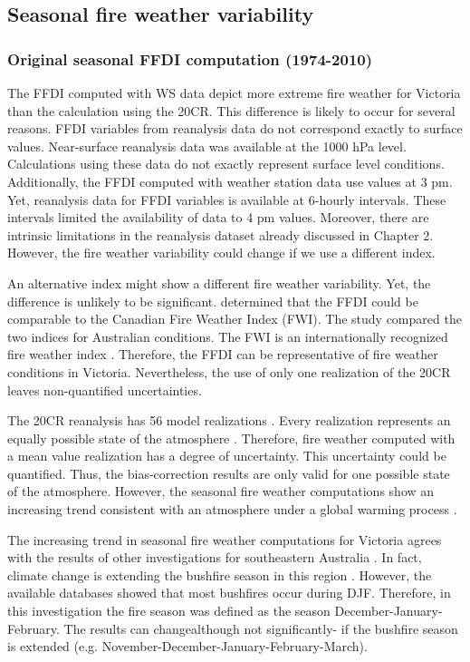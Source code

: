 \subsection{Seasonal fire weather variability \label{sub:Seasonal-fire-weather-variability}}


\subsubsection{Original seasonal FFDI computation (1974-2010)}

The FFDI computed with WS data depict more extreme fire weather for
Victoria than the calculation using the 20CR. This difference is likely
to occur for several reasons. FFDI variables from reanalysis data
do not correspond exactly to surface values. Near-surface reanalysis
data was available at the 1000 hPa level. Calculations using these
data do not exactly represent surface level conditions. Additionally,
the FFDI computed with weather station data use values at 3 pm. Yet,
reanalysis data for FFDI variables is available at 6-hourly intervals.
These intervals limited the availability of data to 4 pm values. Moreover,
there are intrinsic limitations in the reanalysis dataset already
discussed in Chapter 2. However, the fire weather variability could
change if we use a different index. 

An alternative index might show a different fire weather variability.
Yet, the difference is unlikely to be significant. \citet{Dowdy2009}
determined that the FFDI could be comparable to the Canadian Fire
Weather Index (FWI). The study compared the two indices for Australian
conditions. The FWI is an internationally recognized fire weather
index \citep{VanWagner1974,VanWagner2005,Dowdy2009a}. Therefore,
the FFDI can be representative of fire weather conditions in Victoria.
Nevertheless, the use of only one realization of the 20CR leaves non-quantified
uncertainties. 

The 20CR reanalysis has 56 model realizations \citep{Compo2011}.
Every realization represents an equally possible state of the atmosphere
\citep{Compo2011}. Therefore, fire weather computed with a mean value
realization has a degree of uncertainty. This uncertainty could be
quantified. Thus, the bias-correction results are only valid for one
possible state of the atmosphere. However, the seasonal fire weather
computations show an increasing trend consistent with an atmosphere
under a global warming process \citep{Stocker2013}. 

The increasing trend in seasonal fire weather computations for Victoria
agrees with the results of other investigations for southeastern Australia
\citep{Lucas2007,Hennessy2005,Hasson2009,Clarke2013}. In fact, climate
change is extending the bushfire season in this region \citep{Clarke2011}.
However, the available databases showed that most bushfires occur
during DJF. Therefore, in this investigation the fire season was defined
as the season December-January-February. The results can change\textemdash although
not significantly- if the bushfire season is extended (e.g. November-December-January-February-March\textemdash ). 


